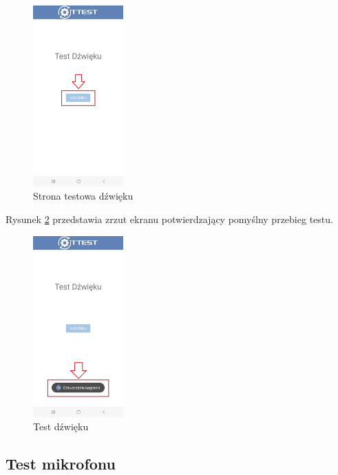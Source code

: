 \begin{figure}[!hbt]
	\begin{center}
		\includegraphics[angle=360, width=0.31\textwidth]{rys/punkt6/dźwięk}
		\caption{Strona testowa dźwięku}
		\label{rys:dźwięk}
	\end{center}
\end{figure}

Rysunek \ref{rys:dźwięk2} przedstawia zrzut ekranu potwierdzający pomyślny przebieg testu.

\begin{figure}[!hbt]
	\begin{center}
		\includegraphics[angle=360, width=0.31\textwidth]{rys/punkt6/dźwięk2}
		\caption{Test dźwięku}
		\label{rys:dźwięk2}
	\end{center}
\end{figure}

\newpage


\subsection{Test mikrofonu}

